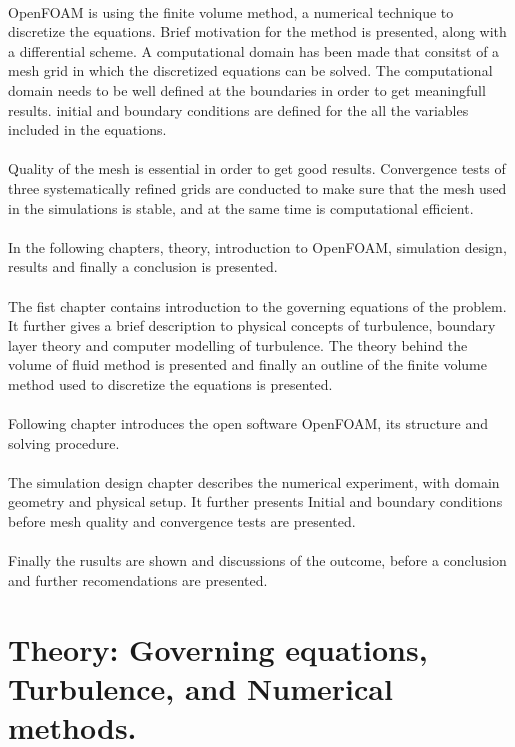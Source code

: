 \documentclass[a4paper, 12pt]{report}
\begin{document}
\\
OpenFOAM is using the finite volume method, a numerical technique to discretize the equations. Brief motivation for the method is presented, along with a differential scheme. A computational domain has been made that consitst of a mesh grid in which the discretized equations can be solved. The computational domain needs to be well defined at the boundaries in order to get meaningfull results. initial and boundary conditions are defined for the all the variables included in the equations.\\
\\
Quality of the mesh is essential in order to get good results. Convergence tests of three systematically refined grids are conducted to make sure that the mesh used in the simulations is stable, and at the same time is computational efficient.\\
\\
In the following chapters, theory, introduction to OpenFOAM, simulation design, results and finally a conclusion is presented.\\
\\
The fist chapter contains introduction to the governing equations of the problem. It further gives a brief description to physical concepts of turbulence, boundary layer theory and computer modelling of turbulence. The theory behind the volume of fluid method is presented and finally an outline of the finite volume method used to discretize the equations is presented.\\
\\
Following chapter introduces the open software OpenFOAM, its structure and solving procedure.\\
\\
The simulation design chapter describes the numerical experiment, with domain geometry and physical setup. It further presents Initial and boundary conditions before mesh quality and convergence tests are presented.\\
\\
Finally the rusults are shown and discussions of the outcome, before a conclusion and further recomendations are presented.  
\chapter{Theory: Governing equations, Turbulence, and Numerical methods.}
\end{document}
